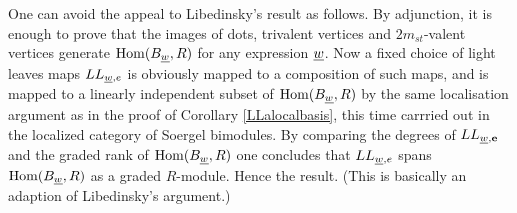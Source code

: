 \begin{remark} One can avoid the appeal to Libedinsky's result as follows. By adjunction, it is enough to prove that the images of dots, trivalent vertices and $2m_{st}$-valent vertices generate $\operatorname{Hom}(B_{\underline{w}}, R)$ for any expression $\underline{w}$. Now a fixed choice of light leaves maps $LL_{\underline{w},e}$ is obviously mapped to a composition of such maps, and is mapped to a linearly independent subset of $\operatorname{Hom}(B_{\underline{w}}, R)$ by the same localisation argument as in the proof of Corollary \ref{LLalocalbasis}, this time carrried out in the localized category of Soergel bimodules. By comparing the degrees of $LL_{{\underline{w}},{\mathbf e}}$ and the graded rank of $\operatorname{Hom}(B_{\underline{w}}, R)$ one concludes that $LL_{\underline{w},e}$ spans $\operatorname{Hom}(B_{\underline{w}}, R)$ as a graded $R$-module. Hence the result. (This is basically an adaption of Libedinsky's argument.)
\end{remark}


